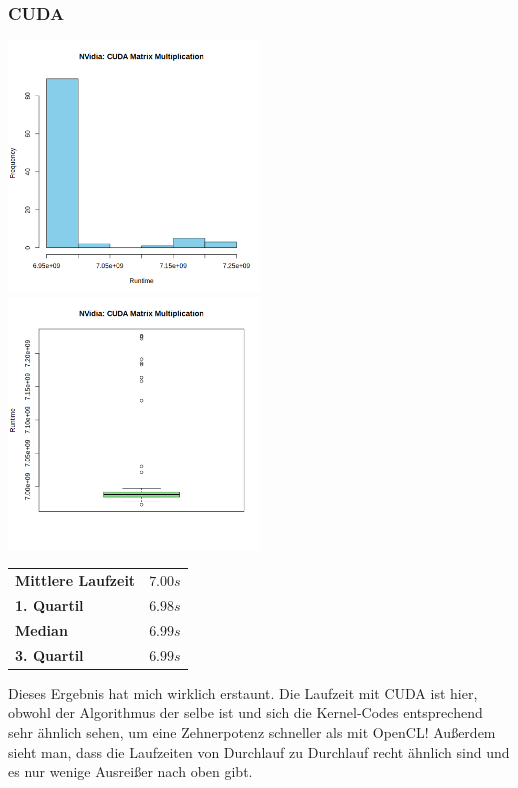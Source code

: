 \documentclass[12pt]{article}
\begin{document}
	\subsubsection*{CUDA}
	\includegraphics[width=0.5\textwidth]{../statistics/nvidia/cuda/histogram_matmul.png}
	\includegraphics[width=0.5\textwidth]{../statistics/nvidia/cuda/boxplot_matmul.png}
	\\
	\begin{center}
		\begin{tabular}{|l|l|}
			\toprule
			\textbf{Mittlere Laufzeit} 		& $7.00s$ \\
			\textbf{1. Quartil}				& $6.98s$ \\
			\textbf{Median}					& $6.99s$  \\
			\textbf{3. Quartil}				& $6.99s$  \\
			\bottomrule
		\end{tabular}
	\end{center}
	\medskip
	
	Dieses Ergebnis hat mich wirklich erstaunt. 
	Die Laufzeit mit CUDA ist hier, obwohl der Algorithmus der selbe ist und sich die Kernel-Codes entsprechend sehr ähnlich sehen, um eine Zehnerpotenz schneller als mit OpenCL!
	Außerdem sieht man, dass die Laufzeiten von Durchlauf zu Durchlauf recht ähnlich sind und es nur wenige Ausreißer nach oben gibt.
	
\end{document}
